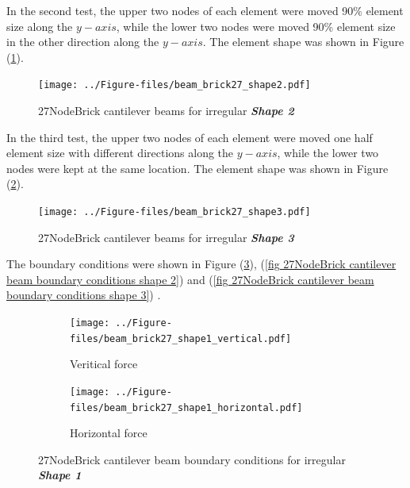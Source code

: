 \documentclass[fleqn,11pt]{article}
\begin{document}
In the second test, the upper two nodes of each element were moved 90\% element size along the $y-axis$, while the lower two nodes were moved 90\% element size in the other direction along the $y-axis$. The element shape was shown in Figure (\ref{fig irregular shape 2 27NodeBrick cantilever beams }).

\begin{figure}[H]
  \centering
  \texttt{[image: ../Figure-files/beam\_brick27\_shape2.pdf]}
  \caption{27NodeBrick cantilever beams for irregular \textbf{\emph{Shape 2}} }
  \label{fig irregular shape 2 27NodeBrick cantilever beams }
\end{figure}



In the third test, the upper two nodes of each element were moved one half element size with different directions along the $y-axis$, while the lower two nodes were kept at the same location. The element shape was shown in Figure (\ref{fig irregular shape 3 27NodeBrick cantilever beams }).

\begin{figure}[H]
  \centering
  \texttt{[image: ../Figure-files/beam\_brick27\_shape3.pdf]}
  \caption{27NodeBrick cantilever beams for irregular \textbf{\emph{Shape 3}} }
  \label{fig irregular shape 3 27NodeBrick cantilever beams }
\end{figure}

The boundary conditions were shown in Figure (\ref{fig 27NodeBrick cantilever beam boundary conditions shape 1}), (\ref{fig 27NodeBrick cantilever beam boundary conditions shape 2}) and (\ref{fig 27NodeBrick cantilever beam boundary conditions shape 3}) .

\begin{figure}[H]
  \centering
    \begin{subfigure}{0.5\textwidth}
      \centering
      \texttt{[image: ../Figure-files/beam\_brick27\_shape1\_vertical.pdf]}
      \caption{Veritical force}
    \end{subfigure}
    \begin{subfigure}{0.5\textwidth}
      \centering
      \texttt{[image: ../Figure-files/beam\_brick27\_shape1\_horizontal.pdf]}
      \caption{Horizontal force}
    \end{subfigure}
  \caption{27NodeBrick cantilever beam boundary conditions for irregular \textbf{\emph{Shape 1}} }
  \label{fig 27NodeBrick cantilever beam boundary conditions shape 1}
\end{figure}
\end{document}
